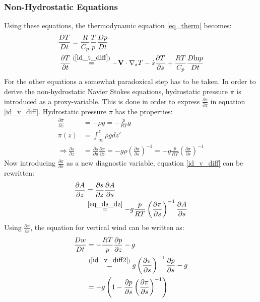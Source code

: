 \subsubsection{Non-Hydrostatic Equations}\label{sec:non_hydrostatic}
Using these equations, the thermodynamic equation \ref{eq_therm} becomes:
\begin{align*}
\frac{DT}{Dt} &= \frac{R}{C_p}\frac{T}{p}\frac{Dp}{Dt}\\
\frac{\partial T}{\partial t} &\stackrel{(\ref{id_t_diff})}{=} -\textbf{V} \cdot \nabla _s T - \dot{s} \frac{\partial T}{\partial s}+\frac{RT}{C_p}\frac{D\text{ln}p}{Dt}
\end{align*}
For the other equations a somewhat paradoxical step has to be taken.
In order to derive the non-hydrostatic Navier Stokes equations, hydrostatic pressure $\pi$ is introduced as a proxy-variable.
This is done in order to express $\frac{\partial s}{\partial z}$ in equation \ref{id_v_diff}.
Hydrostatic pressure $\pi$ has the properties:
\begin{align}
\frac{\partial \pi}{\partial z} &= -\rho g = - \frac{p}{RT}g \nonumber \\
\pi(z) &= \int_\infty ^z \rho g dz' \nonumber \\
\Rightarrow \frac{\partial s}{\partial z} &= \frac{\partial s}{\partial \pi}\frac{\partial \pi}{\partial z} = - g\rho\left(\frac{\partial \pi}{\partial s}\right)^{-1} = - g\frac{p}{RT}\left(\frac{\partial \pi}{\partial s}\right)^{-1} \label{eq_ds_dz}
\end{align}
Now introducing $\frac{\partial \pi}{\partial s}$ as a new diagnostic variable, equation \ref{id_v_diff} can be rewritten:
\begin{align}
\frac{\partial A}{\partial z} &= \frac{\partial s}{\partial z} \frac{\partial A}{\partial s}\nonumber\\
&\stackrel{\ref{eq_ds_dz}}{=} - g\frac{p}{RT}\left(\frac{\partial \pi}{\partial s}\right)^{-1}\frac{\partial A}{\partial s}\label{id_v_diff2}
\end{align}
Using $\frac{\partial \pi}{\partial s}$, the equation for vertical wind can be written as:
\begin{align*}
\frac{Dw}{Dt} &= - \frac{RT}{p} \frac{\partial p}{\partial z} - g\\
&\stackrel{(\ref{id_v_diff2})}{=} g \left(\frac{\partial \pi}{\partial s}\right)^{-1}\frac{\partial p}{\partial s} - g\\
&= -g\left(1 - \frac{\partial p}{\partial s}\left(\frac{\partial \pi}{\partial s}\right)^{-1}\right)
\end{align*}
